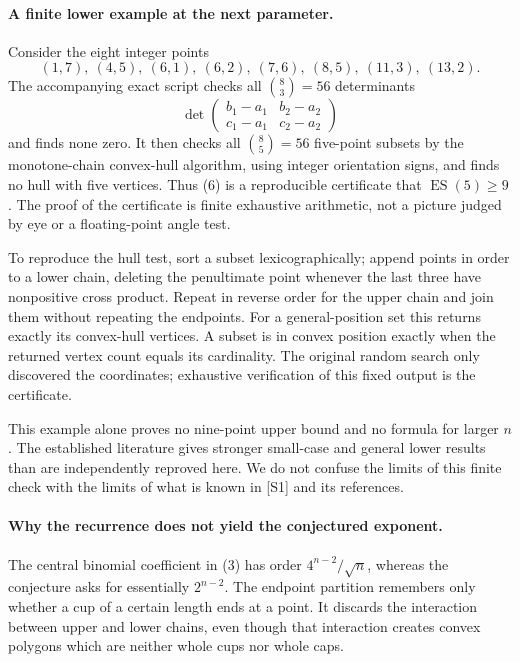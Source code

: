 \documentclass[11pt]{article}
\begin{document}
\paragraph{A finite lower example at the next parameter.}
Consider the eight integer points
\[
 (1,7),\ (4,5),\ (6,1),\ (6,2),\ (7,6),\ (8,5),\ (11,3),\ (13,2).
                                                               \tag{6}
\]
The accompanying exact script checks all $\binom83=56$ determinants
\[
 \det\begin{pmatrix}b_1-a_1&b_2-a_2\\c_1-a_1&c_2-a_2\end{pmatrix}
\]
and finds none zero. It then checks all $\binom85=56$ five-point
subsets by the monotone-chain convex-hull algorithm, using integer
orientation signs, and finds no hull with five vertices.
Thus (6) is a reproducible certificate that $\operatorname{ES}(5)\ge9$.
The proof of the certificate is finite exhaustive arithmetic, not a
picture judged by eye or a floating-point angle test.

To reproduce the hull test, sort a subset lexicographically; append
points in order to a lower chain, deleting the penultimate point
whenever the last three have nonpositive cross product. Repeat in
reverse order for the upper chain and join them without repeating
the endpoints. For a general-position set this returns exactly its
convex-hull vertices. A subset is in convex position exactly when
the returned vertex count equals its cardinality.
The original random search only discovered the coordinates; exhaustive
verification of this fixed output is the certificate.

This example alone proves no nine-point upper bound and no formula
for larger $n$. The established literature gives stronger small-case
and general lower results than are independently reproved here.
We do not confuse the limits of this finite check with the limits of
what is known in [S1] and its references.

\paragraph{Why the recurrence does not yield the conjectured exponent.}
The central binomial coefficient in (3) has order
$4^{n-2}/\sqrt n$, whereas the conjecture asks for essentially
$2^{n-2}$. The endpoint partition remembers only whether a cup of a
certain length ends at a point. It discards the interaction between
upper and lower chains, even though that interaction creates convex
polygons which are neither whole cups nor whole caps.
\end{document}
